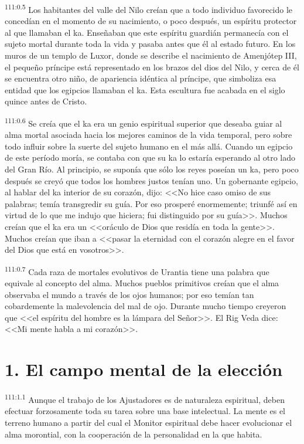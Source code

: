 \documentclass[twoside, 11pt]{book}
\begin{document}
\par
\textsuperscript{111:0.5} Los habitantes del valle del Nilo creían que a todo individuo favorecido le concedían en el momento de su nacimiento, o poco después, un espíritu protector al que llamaban el ka. Enseñaban que este espíritu guardián permanecía con el sujeto mortal durante toda la vida y pasaba antes que él al estado futuro. En los muros de un templo de Luxor, donde se describe el nacimiento de Amenjótep III, el pequeño príncipe está representado en los brazos del dios del Nilo, y cerca de él se encuentra otro niño, de apariencia idéntica al príncipe, que simboliza esa entidad que los egipcios llamaban el ka. Esta escultura fue acabada en el siglo quince antes de Cristo.

\par
\textsuperscript{111:0.6} Se creía que el ka era un genio espiritual superior que deseaba guiar al alma mortal asociada hacia los mejores caminos de la vida temporal, pero sobre todo influir sobre la suerte del sujeto humano en el más allá. Cuando un egipcio de este período moría, se contaba con que su ka lo estaría esperando al otro lado del Gran Río. Al principio, se suponía que sólo los reyes poseían un ka, pero poco después se creyó que todos los hombres justos tenían uno. Un gobernante egipcio, al hablar del ka interior de su corazón, dijo: <<No hice caso omiso de sus palabras; temía transgredir su guía. Por eso prosperé enormemente; triunfé así en virtud de lo que me indujo que hiciera; fui distinguido por su guía>>. Muchos creían que el ka era un <<oráculo de Dios que residía en toda la gente>>. Muchos creían que iban a <<pasar la eternidad con el corazón alegre en el favor del Dios que está en vosotros>>.

\par
\textsuperscript{111:0.7} Cada raza de mortales evolutivos de Urantia tiene una palabra que equivale al concepto del alma. Muchos pueblos primitivos creían que el alma observaba el mundo a través de los ojos humanos; por eso temían tan cobardemente la malevolencia del mal de ojo. Durante mucho tiempo creyeron que <<el espíritu del hombre es la lámpara del Señor>>. El Rig Veda dice: <<Mi mente habla a mi corazón>>.

\section*{1. El campo mental de la elección}
\par
\textsuperscript{111:1.1} Aunque el trabajo de los Ajustadores es de naturaleza espiritual, deben efectuar forzosamente toda su tarea sobre una base intelectual. La mente es el terreno humano a partir del cual el Monitor espiritual debe hacer evolucionar el alma morontial, con la cooperación de la personalidad en la que habita.
\end{document}
